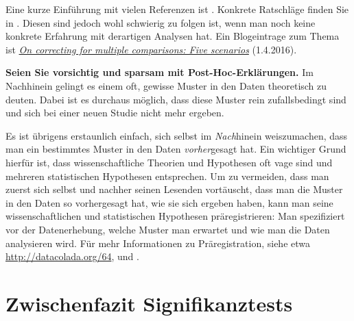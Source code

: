 \documentclass[oneside, 10pt]{book}\usepackage[]{graphicx}\usepackage[]{xcolor}
\begin{document}
Eine kurze Einführung mit vielen Referenzen ist \citet{Bender2001}.
Konkrete Ratschläge finden Sie in \citet{Ruxton2008}. Diesen sind jedoch wohl
schwierig zu folgen ist,
wenn man noch keine konkrete Erfahrung mit derartigen
Analysen hat. Ein Blogeintrage zum Thema ist \href{https://janhove.github.io/analysis/2016/04/01/multiple-comparisons-scenarios}{\textit{On correcting for multiple comparisons: Five scenarios}}
(1.4.2016).

\medskip

\begin{framed}
\noindent \textbf{Seien Sie vorsichtig und sparsam mit Post-Hoc-Erklärungen.}
 Im Nachhinein gelingt es einem oft, gewisse Muster in den Daten
 theoretisch zu deuten. Dabei ist es durchaus möglich, dass diese Muster
 rein zufallsbedingt sind und sich
 bei einer neuen Studie nicht mehr ergeben.

 Es ist übrigens erstaunlich einfach, sich selbst
 im \emph{Nach}hinein weiszumachen, dass man ein bestimmtes Muster
 in den Daten \emph{vorher}gesagt
 hat. Ein wichtiger Grund hierfür ist, dass wissenschaftliche Theorien
 und Hypothesen oft vage sind und mehreren statistischen Hypothesen entsprechen.
 Um zu vermeiden,
 dass man zuerst sich selbst und nachher seinen Lesenden vortäuscht, dass
 man die Muster in den Daten so vorhergesagt hat, wie sie sich ergeben haben,
 kann man seine wissenschaftlichen und statistischen Hypothesen
 präregistrieren: Man spezifiziert vor der Datenerhebung, welche Muster
 man erwartet und wie man die Daten analysieren wird.
 Für mehr Informationen zu Präregistration, siehe etwa
 \url{http://datacolada.org/64}, \citet{Wagenmakers2012b}
 und \citet{Chambers2017}.
\end{framed}

\section{Zwischenfazit Signifikanztests}
\end{document}
